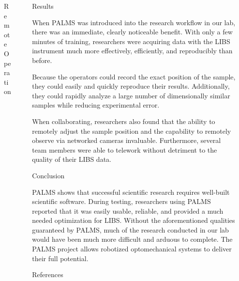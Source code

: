 \documentclass[final, aspectratio=169]{beamer}
\newlength{\sepwidth}
\newlength{\colwidth}
\newcommand{\separatorcolumn}{\begin{column}{\sepwidth}\end{column}}
\begin{document}
\begin{frame}[t]
\begin{columns}[t]
\begin{column}{\colwidth}
\begin{block}{Remote Operation}
  \end{block}
  
\end{column}

\separatorcolumn

\begin{column}{\colwidth}

  \begin{block}{Results}

    When PALMS was introduced into the research workflow in our lab, there was an immediate, clearly noticeable benefit.
    With only a few minutes of training, researchers were acquiring data with the LIBS instrument much more 
    effectively, efficiently, and reproducibly than before.
    
    Because the operators could record the exact position of the sample, they could easily and quickly reproduce their results.
    Additionally, they could rapidly analyze a large number of dimensionally similar samples while reducing experimental error.

    When collaborating, researchers also found that the ability to remotely adjust the sample position 
    and the capability to remotely observe via networked cameras invaluable.
    Furthermore, several team members were able to telework without detriment to the quality of their LIBS data.

  \end{block}

  \begin{block}{Conclusion}

    PALMS shows that successful scientific research requires well-built scientific software.
    During testing, researchers using PALMS reported that it was 
    easily usable, 
    reliable, 
    and provided a much needed optimization for LIBS.
    Without the aforementioned qualities guaranteed by PALMS, 
    much of the research conducted in our lab would have been much more difficult and arduous to complete.
    The PALMS project allows robotized optomechanical systems to deliver their full potential.

  \end{block}

  \begin{block}{References}

    \nocite{*}
    \footnotesize{}

  \end{block}

\end{column}

\separatorcolumn
\end{columns}
\end{frame}
\end{document}
